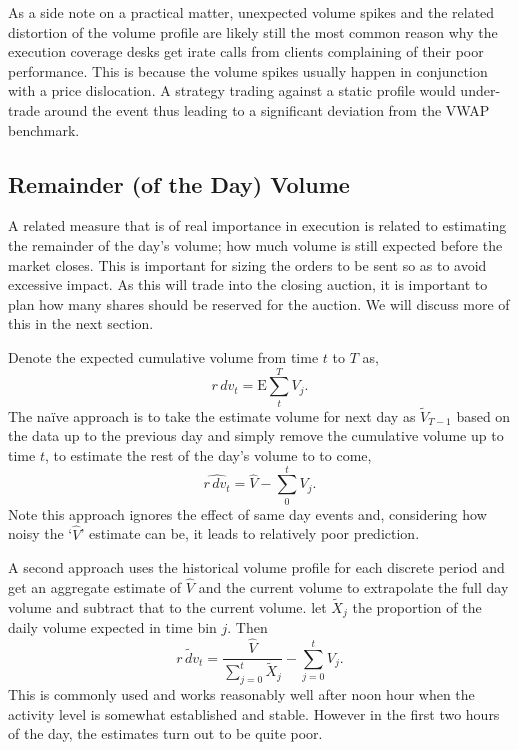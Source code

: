 As a side note on a practical matter, unexpected volume spikes and the related distortion of the volume profile are likely still the most common reason why the execution coverage desks get irate calls from clients complaining of their poor performance. This is because the volume spikes usually happen in conjunction with a price dislocation. A strategy trading against a static profile would under-trade around the event thus leading to a significant deviation from the VWAP benchmark. \label{in:normalization2}



\subsection{Remainder (of the Day) Volume\label{sec:remainder_day}}\label{in:vol_prof1}

A related measure that is of real importance in execution is related to estimating the remainder of the day's volume; how much volume is still expected before the market closes. This is important for sizing the orders to be sent so as to avoid excessive impact. As this will trade into the closing auction, it is important to plan how many shares should be reserved for the auction. We will discuss more of this in the next section.


Denote the expected cumulative volume from time $t$ to $T$ as,
	\begin{equation} \label{eq:rdv_1}
	r \,dv_t = \text{E} \sum_t^T V_j.
	\end{equation}
The na\"ive approach is to take the estimate volume for next day as $\tilde{V}_{T-1}$  based on the data up to the previous day and simply remove the cumulative volume up to time $t$, to estimate the rest of the day's volume to to come,
	\begin{equation}\label{eq:rdv_2}
	\widehat{r\,dv_t}=  \hat{V} - \sum_0^t V_j.
	\end{equation}
Note this approach ignores the effect of same day events and, considering how noisy the `$\hat{V}$' estimate can be, it leads to relatively poor prediction.


A second approach uses the historical volume profile for each discrete period and get an aggregate estimate of $\hat{V}$ and the current volume to extrapolate the full day volume and subtract that to the current volume. let $\tilde{X}_j$ the proportion of the daily volume expected in time bin $j$. Then
	\begin{equation} \label{eq:rdv_3}
	\widetilde{r\,dv_t}= \dfrac{\hat{V}}{\sum_{j=0}^t \tilde{X}_j} - \sum_{j=0}^t V_j.
	\end{equation}
This is commonly used and works reasonably well after noon hour when the activity level is somewhat established and stable. However in the first two hours of the day, the estimates turn out to be quite poor.


